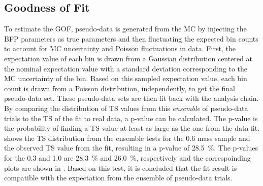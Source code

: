 


\subsection{Goodness of Fit} 

To estimate the GOF, pseudo-data is generated from the MC by injecting the BFP parameters as true parameters and then fluctuating the expected bin counts to account for MC uncertainty and Poisson fluctuations in data. First, the expectation value of each bin is drawn from a Gaussian distribution centered at the nominal expectation value with a standard deviation corresponding to the MC uncertainty of the bin. Based on this sampled expectation value, each bin count is drawn from a Poisson distribution, independently, to get the final pseudo-data set. These pseudo-data sets are then fit back with the analysis chain. By comparing the distribution of TS values from this \textit{ensemble} of pseudo-data trials to the TS of the fit to real data, a p-value can be calculated. The p-value is the probability of finding a TS value at least as large as the one from the data fit.  shows the TS distribution from the ensemble tests for the \SI{0.6}{\gev} mass sample and the observed TS value from the fit, resulting in a p-value of \SI{28.5}{\percent}. The p-values for the \SI{0.3}{\gev} and \SI{1.0}{\gev} are \SI{28.3}{\percent} and \SI{26.0}{\percent}, respectively and the correspoinding plots are shown in . Based on this test, it is concluded that the fit result is compatible with the expectation from the ensemble of pseudo-data trials.

